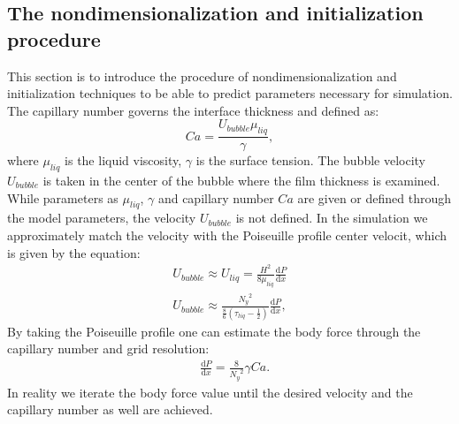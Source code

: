\documentclass{article}
\begin{document}
\subsection{The nondimensionalization and initialization procedure}
This section is to introduce the procedure of nondimensionalization and
initialization techniques to be able to predict parameters necessary for
simulation. The capillary number governs the interface thickness and defined as:
\begin{equation}
Ca=\frac{U_{bubble} \mu_{liq}}{\gamma},
\end{equation}
where $\mu_{liq}$ is the liquid viscosity, $\gamma$ is the surface tension. The
bubble velocity $U_{bubble}$ is taken in the center of the bubble where the film
thickness is examined. 
While parameters as $\mu_{liq}$, $\gamma$ and capillary number $Ca$ are given
or defined through the model parameters, the velocity $U_{bubble}$ is not
defined. In the simulation we approximately match the velocity with the
Poiseuille profile center velocit, which is given by the equation:
\begin{equation}
\begin{aligned}
U_{bubble} \approx U_{liq}=\frac{H^2}{8
\mu_{liq}}\frac{\mathrm{d}P}{\mathrm{d}x}\\
U_{bubble}\approx
\frac{{N_y}^2}{\frac{8}{6}(\tau_{liq}-\frac{1}{2})}\frac{\mathrm{d}P}{\mathrm{d}
x } ,
\end{aligned}
\end{equation}
By taking the Poiseuille profile one can estimate the body force through the
capillary number and grid resolution:
\begin{equation}
\label{poiseuille:velocity:center}
\begin{aligned}
&\frac{\mathrm{d}P}{\mathrm{d}x}=\frac{8}{{N_y}^2}\gamma Ca.
\end{aligned}
\end{equation}
In reality we iterate the body force value
until the desired velocity and the capillary number as well are achieved. 
\end{document}
